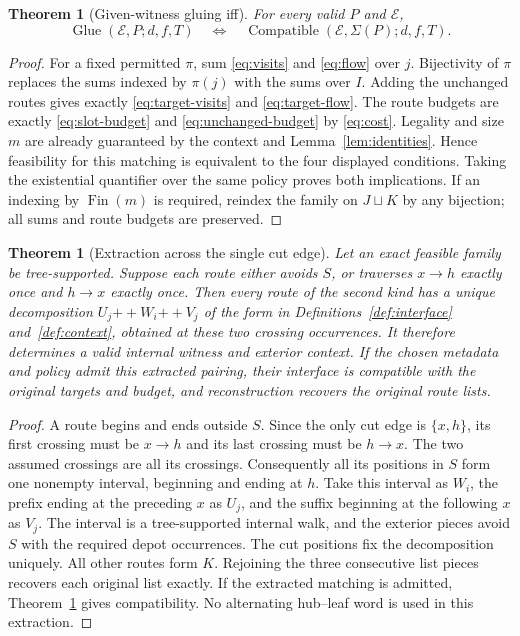 \documentclass[11pt]{article}
\newtheorem{theorem}[definition]{Theorem}
\theoremstyle{remark}
\newcommand{\cat}{\mathbin{+\!+}}
\newcommand{\Compat}{\operatorname{Compatible}}
\newcommand{\Glue}{\operatorname{Glue}}
\begin{document}
\begin{theorem}[Given-witness gluing iff]
\label{thm:glue}
For every valid $P$ and $\mathcal E$,
\[
 \Glue(\mathcal E,P;d,f,T)
 \quad\Longleftrightarrow\quad
 \Compat(\mathcal E,\Sigma(P);d,f,T).
\]
\end{theorem}
\begin{proof}
For a fixed permitted $\pi$, sum \eqref{eq:visits} and \eqref{eq:flow} over
$j$. Bijectivity of $\pi$ replaces the sums indexed by $\pi(j)$ with the sums
over $I$. Adding the unchanged routes gives exactly
\eqref{eq:target-visits} and \eqref{eq:target-flow}. The route budgets are
exactly \eqref{eq:slot-budget} and \eqref{eq:unchanged-budget} by
\eqref{eq:cost}. Legality and size $m$ are already guaranteed by the context
and Lemma~\ref{lem:identities}. Hence feasibility for this matching is
equivalent to the four displayed conditions. Taking the existential
quantifier over the same policy proves both implications. If an indexing by
$\operatorname{Fin}(m)$ is required, reindex the family on $J\sqcup K$ by any
bijection; all sums and route budgets are preserved.
\end{proof}

\begin{theorem}[Extraction across the single cut edge]
\label{thm:extraction}
Let an exact feasible family be tree-supported. Suppose each route either
avoids $S$, or traverses $x\to h$ exactly once and $h\to x$ exactly once.
Then every route of the second kind has a unique decomposition
$U_j\cat W_i\cat V_j$ of the form in Definitions~\ref{def:interface}
and~\ref{def:context}, obtained at these two crossing occurrences. It
therefore determines a valid internal witness and exterior context. If the
chosen metadata and policy admit this extracted pairing, their interface is
compatible with the original targets and budget, and reconstruction recovers
the original route lists.
\end{theorem}
\begin{proof}
A route begins and ends outside $S$. Since the only cut edge is $\{x,h\}$,
its first crossing must be $x\to h$ and its last crossing must be $h\to x$.
The two assumed crossings are all its crossings. Consequently all its
positions in $S$ form one nonempty interval, beginning and ending at $h$.
Take this interval as $W_i$, the prefix ending at the preceding $x$ as $U_j$,
and the suffix beginning at the following $x$ as $V_j$. The interval is a
tree-supported internal walk, and the exterior pieces avoid $S$ with the
required depot occurrences. The cut positions fix the decomposition uniquely.
All other routes form $K$. Rejoining the three consecutive list pieces
recovers each original list exactly. If the extracted matching is admitted,
Theorem~\ref{thm:glue} gives compatibility. No alternating hub--leaf word is
used in this extraction.
\end{proof}
\end{document}
